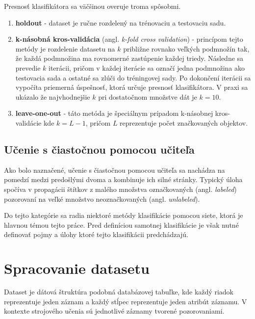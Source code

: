 \documentclass[slovak,master,dept460,male,cpp,cpdeclaration]{diploma}
\begin{document}
Presnosť klasifikátora sa väčšinou overuje troma spôsobmi.
\begin{enumerate}
\item \textbf{holdout} - dataset je ručne rozdelený na trénovaciu a testovaciu sadu. 
\item \textbf{ k-násobná kros-validácia} (angl. \textit{k-fold cross validation}) - princípom tejto metódy je rozdelenie datasetu na $k$ približne rovnako veľkých podmnožín tak, že každá podmnožina ma rovnomerné zastúpenie každej triedy. Následne sa prevedie $k$ iterácii, pričom v každej iterácie sa označí jedna podmnožina ako testovacia sada a ostatné sa zlúči do tréningovej sady. Po dokončení iterácii sa vypočíta priemerná úspešnosť, ktorá určuje presnosť klasifikátora. V praxi sa ukázalo že najvhodnejšie $k$ pri dostatočnom množstve dát je $k = 10$.
\item \textbf{leave-one-out} - táto metóda je špeciálnym prípadom  k-násobnej kros-validácie kde $k=L -1$, pričom  $L$ reprezentuje počet značkovaných objektov.
\end{enumerate}

\subsection{Učenie s čiastočnou pomocou učiteľa}
Ako bolo naznačené, učenie s čiastočnou pomocou učiteľa sa nachádza na pomedzí medzi predošlými dvoma a kombinuje ich silné stránky. Typický úloha spočíva v propagácii štítkov z malého množstva označkovaných (angl. \textit{labeled}) pozorovaní na veľké množstvo neoznačkovaných (angl. \textit{unlabeled}).

Do tejto kategórie sa radia niektoré metódy klasifikácie pomocou siete, ktorá je hlavnou témou tejto práce. Pred definíciou samotnej klasifikácie je však nutné definovať pojmy a úlohy ktoré tejto klasifikácii predchádzajú.

\section{Spracovanie datasetu} \label{sec:Dataset}
Dataset je dátová štruktúra podobná databázovej tabuľke, kde každý riadok reprezentuje jeden záznam a každý stĺpec reprezentuje jeden atribút záznamu. V kontexte strojového učenia sú jednotlivé záznamy tvorené pozorovaniami.
\end{document}
